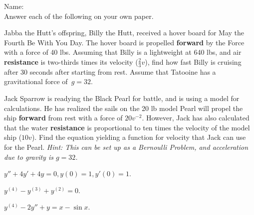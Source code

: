 \documentclass[addpoints, 10pt]{exam}
\begin{document}
%
Name:\enspace\hrulefill\\

Answer each of the following on your own paper.
%

\begin{questions}

\question[20] Jabba the Hutt's offspring, Billy the Hutt, received a hover board for May the Fourth Be With You Day.  The hover board is propelled \textbf{forward} by the Force with a force of 40 lbs.  Assuming that Billy is a lightweight at 640 lbs, and air \textbf{resistance} is two-thirds times its velocity ($\frac 23 v$), find how fast Billy is cruising after 30 seconds after starting from rest.  Assume that Tatooine has a gravitational force of~$g = 32$.  

\question[20] Jack Sparrow is readying the Black Pearl for battle, and is using a model for calculations.  He has realized the sails on the 20 lb model Pearl will propel the ship \textbf{forward} from rest with a force of $20v^{-2}$.  However, Jack has also calculated that the water \textbf{resistance} is proportional to ten times the velocity of the model ship ($10v$).  Find the equation yielding a function for velocity that Jack can use for the Pearl. \emph{Hint: This can be set up as a Bernoulli Problem, and acceleration due to gravity is $g = 32$.}

\vspace{.25in}


\question[20] $y''+ 4y' + 4y = 0, y(0) = 1, y'(0) = 1$.
\vspace{.5in}

\question[20] $y^{(4)} - y^{(3)} + y^{(2)} = 0$.
\vspace{.5in}


\question[20]   $y^{(4)} - 2y'' + y = x - \sin x$.

\end{questions}
\end{document}

